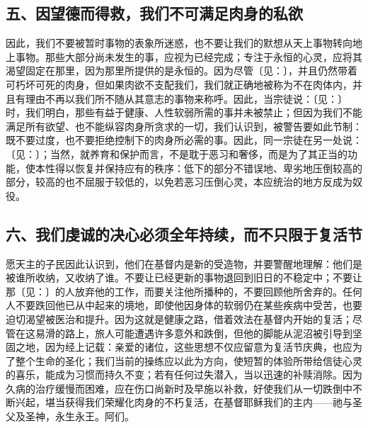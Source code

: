 
\subsection{五、因望德而得救，我们不可满足肉身的私欲}

因此，我们不要被暂时事物的表象所迷惑，也不要让我们的默想从天上事物转向地上事物。那些大部分尚未发生的事，应视为已经完成；专注于永恒的心灵，应将其渴望固定在那里，因为那里所提供的是永恒的。因为尽管〔见：〕，并且仍然带着可朽坏可死的肉身，但如果肉欲不支配我们，我们就正确地被称为不在肉体内，并且有理由不再以我们所不随从其意志的事物来称呼。因此，当宗徒说：〔见：〕时，我们明白，那些有益于健康、人性软弱所需的事并未被禁止；但因为我们不能满足所有欲望、也不能纵容肉身所贪求的一切，我们认识到，被警告要如此节制：既不要过度，也不要拒绝控制下的肉身所必需的事。因此，同一宗徒在另一处说：〔见：〕；当然，就养育和保护而言，不是耽于恶习和奢侈，而是为了其正当的功能，使本性得以恢复并保持应有的秩序：低下的部分不错误地、卑劣地压倒较高的部分，较高的也不屈服于较低的，以免若恶习压倒心灵，本应统治的地方反成为奴役。\par


\subsection{六、我们虔诚的决心必须全年持续，而不只限于复活节}

愿天主的子民因此认识到，他们在基督内是新的受造物，并要警醒地理解：他们是被谁所收纳，又收纳了谁。不要让已经更新的事物退回到旧日的不稳定中；不要让那〔见：〕的人放弃他的工作，而要关注他所播种的，不要回顾他所舍弃的。任何人不要跌回他已从中起来的境地，即使他因身体的软弱仍在某些疾病中受苦，也要迫切渴望被医治和提升。因为这就是健康之路，借着效法在基督内开始的复活；尽管在这易滑的路上，旅人可能遭遇许多意外和跌倒，但他的脚能从泥沼被引导到坚固之地，因为经上记载：亲爱的诸位，这些思想不仅应留意为复活节庆典，也应为了整个生命的圣化；我们当前的操练应以此为方向，使短暂的体验所带给信徒心灵的喜乐，能成为习惯而持久不变；若有任何过失潜入，当以迅速的补赎消除。因为久病的治疗缓慢而困难，应在伤口尚新时及早施以补救，好使我们从一切跌倒中不断兴起，堪当获得我们荣耀化肉身的不朽复活，在基督耶稣我们的主内——祂与圣父及圣神，永生永王。阿们。\par

